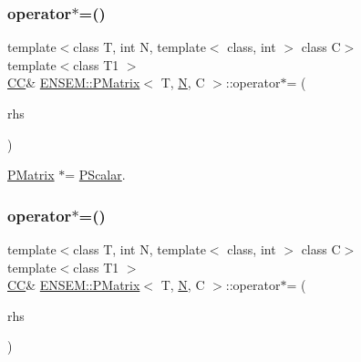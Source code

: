 \subsubsection{\texorpdfstring{operator$\ast$=()}{operator*=()}\hspace{0.1cm}{\footnotesize\ttfamily [1/2]}}
{\footnotesize\ttfamily template$<$class T, int N, template$<$ class, int $>$ class C$>$ \\
template$<$class T1 $>$ \\
\mbox{\hyperlink{classENSEM_1_1PMatrix_a744bac549029029effe32dc1705660ec}{CC}}\& \mbox{\hyperlink{classENSEM_1_1PMatrix}{E\+N\+S\+E\+M\+::\+P\+Matrix}}$<$ T, \mbox{\hyperlink{operator__name__util_8cc_a7722c8ecbb62d99aee7ce68b1752f337}{N}}, C $>$\+::operator$\ast$= (\begin{DoxyParamCaption}\item[{const \mbox{\hyperlink{classENSEM_1_1PScalar}{P\+Scalar}}$<$ T1 $>$ \&}]{rhs }\end{DoxyParamCaption})\hspace{0.3cm}{\ttfamily [inline]}}



\mbox{\hyperlink{classENSEM_1_1PMatrix}{P\+Matrix}} $\ast$= \mbox{\hyperlink{classENSEM_1_1PScalar}{P\+Scalar}}. 

\mbox{\label{classENSEM_1_1PMatrix_a4c25aeda146eb61d41abf6cf625a6153}} 
\subsubsection{\texorpdfstring{operator$\ast$=()}{operator*=()}\hspace{0.1cm}{\footnotesize\ttfamily [2/2]}}
{\footnotesize\ttfamily template$<$class T, int N, template$<$ class, int $>$ class C$>$ \\
template$<$class T1 $>$ \\
\mbox{\hyperlink{classENSEM_1_1PMatrix_a744bac549029029effe32dc1705660ec}{CC}}\& \mbox{\hyperlink{classENSEM_1_1PMatrix}{E\+N\+S\+E\+M\+::\+P\+Matrix}}$<$ T, \mbox{\hyperlink{operator__name__util_8cc_a7722c8ecbb62d99aee7ce68b1752f337}{N}}, C $>$\+::operator$\ast$= (\begin{DoxyParamCaption}\item[{const \mbox{\hyperlink{classENSEM_1_1PScalar}{P\+Scalar}}$<$ T1 $>$ \&}]{rhs }\end{DoxyParamCaption})\hspace{0.3cm}{\ttfamily [inline]}}



